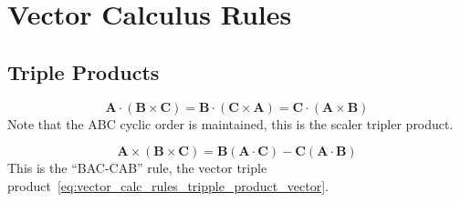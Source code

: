 
\section{Vector Calculus Rules}
\label{sec:vector_calc_rules}

\subsection{Triple Products}
\label{subsec:vector_calc_rules_tripple_product}

\begin{equation}
    \mathbf{A}\cdot(\mathbf{B}\times\mathbf{C})
    = \mathbf{B}\cdot(\mathbf{C}\times\mathbf{A})
    = \mathbf{C}\cdot(\mathbf{A}\times\mathbf{B})
    \label{eq:vector_calc_rules_tripple_product_scalar}
\end{equation}
Note that the ABC cyclic order is maintained, this is the scaler tripler product. 

\begin{equation}
    \mathbf{A}\times(\mathbf{B}\times\mathbf{C})
    = \mathbf{B}(\mathbf{A}\cdot\mathbf{C})
    - \mathbf{C}(\mathbf{A}\cdot\mathbf{B})
    \label{eq:vector_calc_rules_tripple_product_vector}
\end{equation}
This is the ``BAC-CAB'' rule, the vector triple product~\eqref{eq:vector_calc_rules_tripple_product_vector}.